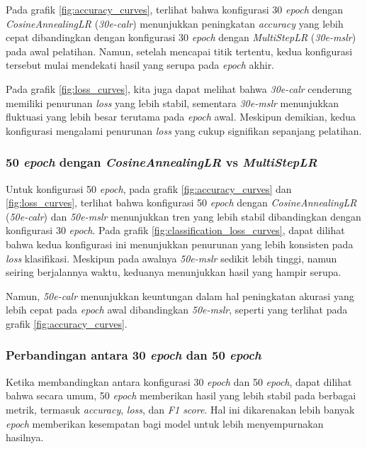Pada grafik \ref{fig:accuracy_curves}, terlihat bahwa konfigurasi 30 \emph{epoch} dengan \emph{CosineAnnealingLR} (\emph{30e-calr}) menunjukkan peningkatan \emph{accuracy} yang lebih cepat dibandingkan dengan konfigurasi 30 \emph{epoch} dengan \emph{MultiStepLR} (\emph{30e-mslr}) pada awal pelatihan. Namun, setelah mencapai titik tertentu, kedua konfigurasi tersebut mulai mendekati hasil yang serupa pada \emph{epoch} akhir. 

Pada grafik \ref{fig:loss_curves}, kita juga dapat melihat bahwa \emph{30e-calr} cenderung memiliki penurunan \emph{loss} yang lebih stabil, sementara \emph{30e-mslr} menunjukkan fluktuasi yang lebih besar terutama pada \emph{epoch} awal. Meskipun demikian, kedua konfigurasi mengalami penurunan \emph{loss} yang cukup signifikan sepanjang pelatihan.

\subsubsection{50 \emph{epoch} dengan \emph{CosineAnnealingLR} vs \emph{MultiStepLR}}

Untuk konfigurasi 50 \emph{epoch}, pada grafik \ref{fig:accuracy_curves} dan \ref{fig:loss_curves}, terlihat bahwa konfigurasi 50 \emph{epoch} dengan \emph{CosineAnnealingLR} (\emph{50e-calr}) dan \emph{50e-mslr} menunjukkan tren yang lebih stabil dibandingkan dengan konfigurasi 30 \emph{epoch}. Pada grafik \ref{fig:classification_loss_curves}, dapat dilihat bahwa kedua konfigurasi ini menunjukkan penurunan yang lebih konsisten pada \emph{loss} klasifikasi. Meskipun pada awalnya \emph{50e-mslr} sedikit lebih tinggi, namun seiring berjalannya waktu, keduanya menunjukkan hasil yang hampir serupa.

Namun, \emph{50e-calr} menunjukkan keuntungan dalam hal peningkatan akurasi yang lebih cepat pada \emph{epoch} awal dibandingkan \emph{50e-mslr}, seperti yang terlihat pada grafik \ref{fig:accuracy_curves}.

\subsubsection{Perbandingan antara 30 \emph{epoch} dan 50 \emph{epoch}}

Ketika membandingkan antara konfigurasi 30 \emph{epoch} dan 50 \emph{epoch}, dapat dilihat bahwa secara umum, 50 \emph{epoch} memberikan hasil yang lebih stabil pada berbagai metrik, termasuk \emph{accuracy}, \emph{loss}, dan \emph{F1 score}. Hal ini dikarenakan lebih banyak \emph{epoch} memberikan kesempatan bagi model untuk lebih menyempurnakan hasilnya.

